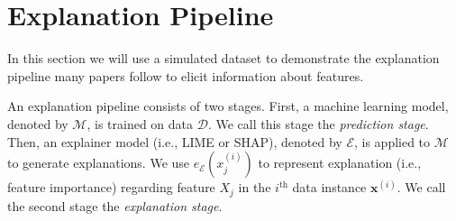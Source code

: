 \documentclass[mnsc,blindrev]{informs3}
\newcommand{\mE}{\mathcal{E}}
\begin{document}

\section{Explanation Pipeline}
    \label{sec:pipeline_demo}
    In this section we will use a simulated dataset to demonstrate the explanation pipeline many papers follow to elicit information about features.
    
An explanation pipeline consists of two stages. First, a machine learning model, denoted by $\mathcal{M}$, is trained on data $\mathcal{D}$. We call this stage the \emph{prediction stage}. Then, an explainer model (i.e., LIME or SHAP), denoted by $\mathcal{E}$, is applied to $\mathcal{M}$ to generate explanations. We use $e_{\mE}(x^{(i)}_j)$ to represent explanation (i.e., feature importance) regarding feature $X_j$ in the $i^{\text{th}}$ data instance $\mathbf{x}^{(i)}$. We call the second stage the \emph{explanation stage}. %
    
\end{document}
